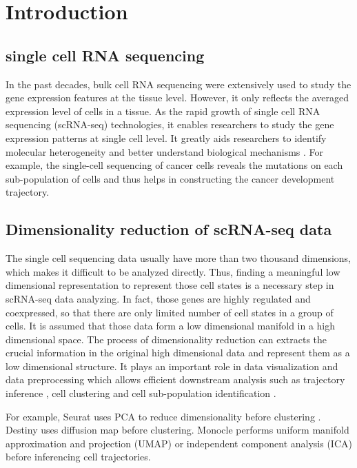 \section{Introduction}

\subsection{single cell RNA sequencing}

In the past decades, bulk cell RNA sequencing were extensively used to study the gene expression features at the tissue level. However, it only reflects the averaged expression level of cells in a tissue. As the rapid growth of single cell RNA sequencing (scRNA-seq) technologies, it enables researchers to study the gene expression patterns at single cell level. It greatly aids researchers to identify molecular heterogeneity and better understand biological mechanisms \cite{shapiro2013single}. For example, the single-cell sequencing of cancer cells reveals the mutations on each sub-population of cells and thus helps in constructing the cancer development trajectory. 

\subsection{Dimensionality reduction of scRNA-seq data}

The single cell sequencing data usually have more than two thousand dimensions, which makes it difficult to be analyzed directly. Thus, finding a meaningful low dimensional representation to represent those cell states is a necessary step in scRNA-seq data analyzing. In fact, those genes are highly regulated and coexpressed, so that there are only limited number of cell states in a group of cells. It is assumed that those data form a low dimensional manifold in a high dimensional space. The process of dimensionality reduction can extracts the crucial information in the original high dimensional data and represent them as a low dimensional structure.  It plays an important role in data visualization and data preprocessing which allows efficient downstream analysis such as trajectory inference \cite{Saelens2019}, cell clustering \cite{weber2016comparison} and cell sub-population identification \cite{Hwang2018}. 

For example, Seurat uses PCA \cite{Abdi2010} to reduce dimensionality before clustering \cite{Satija2015}. Destiny \cite{angerer2016destiny} uses diffusion map before clustering. Monocle \cite{Qiu2017} performs uniform manifold approximation and projection (UMAP) \cite{McInnes2018} or independent component analysis (ICA) \cite{hyvarinen2000independent} before inferencing cell trajectories. 

